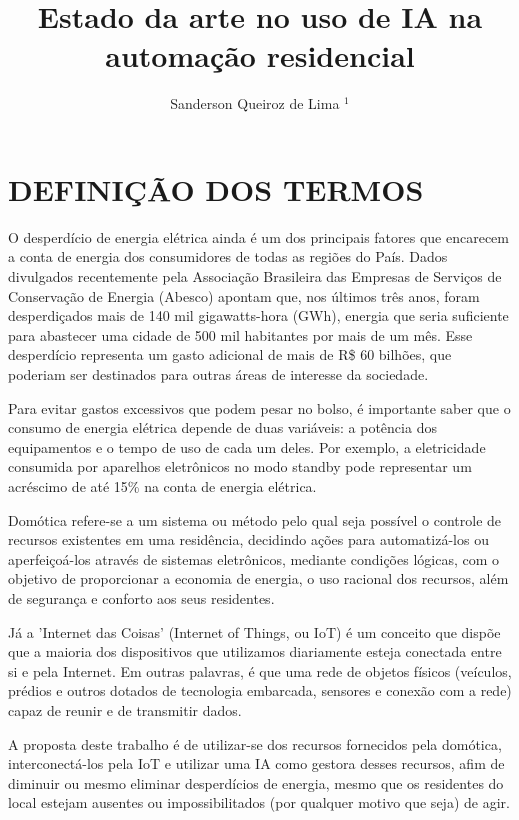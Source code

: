 \documentclass[10pt,brazil,english]{article}
\title{Estado da arte no uso de IA na automação residencial}
\author{Sanderson Queiroz de Lima $^{1}$}
\begin{document}
\pagestyle{fancy} %

\maketitle
\newpage


\section{\uppercase{Definição dos termos}}
O desperdício de energia elétrica ainda é um dos principais fatores que encarecem a conta de energia dos consumidores de todas as regiões do País. Dados divulgados recentemente pela Associação Brasileira das Empresas de Serviços de  Conservação de Energia (Abesco) apontam que, nos últimos três anos, foram desperdiçados mais de 140 mil gigawatts-hora (GWh), energia que seria suficiente para abastecer uma cidade de 500 mil  habitantes por mais de um mês. Esse desperdício representa um gasto adicional de mais de R\$ 60 bilhões, que poderiam ser destinados para outras áreas de interesse da sociedade. 

Para evitar gastos excessivos que podem pesar no bolso, é importante saber que o consumo de energia elétrica depende de duas variáveis: a potência dos equipamentos e o tempo de uso de cada um deles. Por exemplo, a eletricidade consumida por aparelhos eletrônicos no modo standby pode representar um acréscimo de até 15\% na conta de energia elétrica.

Domótica refere-se a um sistema ou método pelo qual seja possível o controle de recursos existentes em uma residência, decidindo ações para automatizá-los ou aperfeiçoá-los através de sistemas eletrônicos,  mediante condições lógicas, com o objetivo de proporcionar a economia de energia, o uso racional dos recursos, além de segurança e conforto aos seus residentes.

Já a 'Internet das Coisas' (Internet of Things, ou IoT) é um conceito que dispõe que a maioria dos dispositivos que utilizamos diariamente esteja conectada entre si e pela Internet. Em outras palavras, é que uma rede de objetos físicos (veículos, prédios e outros dotados de tecnologia embarcada, sensores e conexão com a rede) capaz de reunir e de transmitir dados.

A proposta deste trabalho é de utilizar-se dos recursos fornecidos pela domótica, interconectá-los pela IoT e utilizar uma IA como gestora desses recursos, afim de diminuir ou mesmo eliminar desperdícios de energia, mesmo que os residentes do local estejam ausentes ou impossibilitados (por qualquer motivo que seja) de agir.
\end{document}
